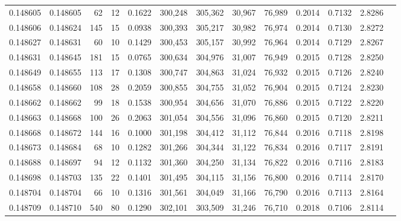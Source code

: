 \begin{tabular}{rrrrrrrrrrrrr}
0.148605 & 0.148605 &    62 &  12 &                                     0.1622 & 300,248 & 305,362 &  30,967 &  76,989 & 0.2014 & 0.7132 & 2.8286 \\
0.148606 & 0.148624 &   145 &  15 &                                     0.0938 & 300,393 & 305,217 &  30,982 &  76,974 & 0.2014 & 0.7130 & 2.8272 \\
0.148627 & 0.148631 &    60 &  10 &                                     0.1429 & 300,453 & 305,157 &  30,992 &  76,964 & 0.2014 & 0.7129 & 2.8267 \\
0.148631 & 0.148645 &   181 &  15 &                                     0.0765 & 300,634 & 304,976 &  31,007 &  76,949 & 0.2015 & 0.7128 & 2.8250 \\
0.148649 & 0.148655 &   113 &  17 &                                     0.1308 & 300,747 & 304,863 &  31,024 &  76,932 & 0.2015 & 0.7126 & 2.8240 \\
0.148658 & 0.148660 &   108 &  28 &                                     0.2059 & 300,855 & 304,755 &  31,052 &  76,904 & 0.2015 & 0.7124 & 2.8230 \\
0.148662 & 0.148662 &    99 &  18 &                                     0.1538 & 300,954 & 304,656 &  31,070 &  76,886 & 0.2015 & 0.7122 & 2.8220 \\
0.148663 & 0.148668 &   100 &  26 &                                     0.2063 & 301,054 & 304,556 &  31,096 &  76,860 & 0.2015 & 0.7120 & 2.8211 \\
0.148668 & 0.148672 &   144 &  16 &                                     0.1000 & 301,198 & 304,412 &  31,112 &  76,844 & 0.2016 & 0.7118 & 2.8198 \\
0.148673 & 0.148684 &    68 &  10 &                                     0.1282 & 301,266 & 304,344 &  31,122 &  76,834 & 0.2016 & 0.7117 & 2.8191 \\
0.148688 & 0.148697 &    94 &  12 &                                     0.1132 & 301,360 & 304,250 &  31,134 &  76,822 & 0.2016 & 0.7116 & 2.8183 \\
0.148698 & 0.148703 &   135 &  22 &                                     0.1401 & 301,495 & 304,115 &  31,156 &  76,800 & 0.2016 & 0.7114 & 2.8170 \\
0.148704 & 0.148704 &    66 &  10 &                                     0.1316 & 301,561 & 304,049 &  31,166 &  76,790 & 0.2016 & 0.7113 & 2.8164 \\
0.148709 & 0.148710 &   540 &  80 &                                     0.1290 & 302,101 & 303,509 &  31,246 &  76,710 & 0.2018 & 0.7106 & 2.8114 \\

\end{tabular}
